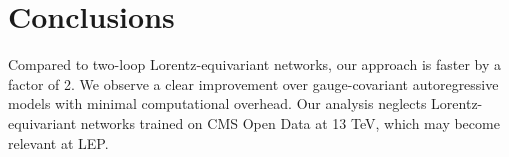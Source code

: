 \section{Conclusions}\label{sec:conclusions}

Compared to two-loop Lorentz-equivariant networks, our approach is
faster by a factor of 2. We observe a clear improvement over
gauge-covariant autoregressive models with minimal computational
overhead. Our analysis neglects Lorentz-equivariant networks trained on
CMS Open Data at 13 TeV, which may become relevant at LEP.

